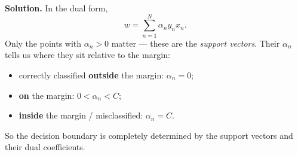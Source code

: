 \documentclass[11pt]{article}
\begin{document}
\begin{enumerate}
		\noindent\textbf{Solution.}
		In the dual form,
		\[
		w = \sum_{n=1}^N \alpha_n y_n x_n.
		\]
		Only the points with $\alpha_n > 0$ matter — these are the \emph{support vectors}. Their $\alpha_n$ tells us where they sit relative to the margin:
		\begin{itemize}
			\item correctly classified \textbf{outside} the margin: $\alpha_n = 0$;
			\item \textbf{on} the margin: $0 < \alpha_n < C$;
			\item \textbf{inside} the margin / misclassified: $\alpha_n = C$.
		\end{itemize}
		So the decision boundary is completely determined by the support vectors and their dual coefficients.
		
	\end{enumerate}
	
\end{document}
